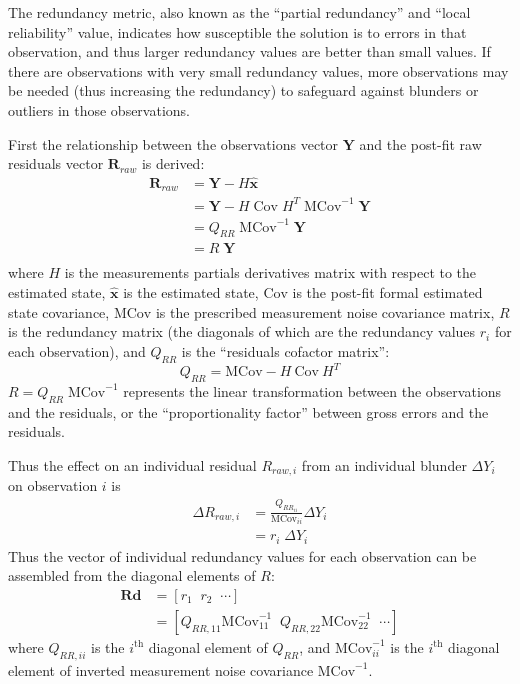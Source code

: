 The redundancy metric, also known as the ``partial redundancy'' and ``local reliability'' value, indicates how susceptible the solution is to errors in that observation, and thus larger redundancy values are better than small values. If there are observations with very small redundancy values, more observations may be needed (thus increasing the redundancy) to safeguard against blunders or outliers in those observations.

First the relationship between the observations vector $\textbf{Y}$ and the post-fit raw residuals vector $\textbf{R}_{raw}$ is derived:
\begin{equation}\label{eq:vhat}
\begin{split}
\textbf{R}_{raw} &= \textbf{Y} - H \hat{\textbf{x}} \\
&= \textbf{Y} - H \; \text{Cov} \; H^T \; \text{MCov}^{-1} \; \textbf{Y} \\
&= Q_{RR} \; \text{MCov}^{-1} \; \textbf{Y} \\
&= R \; \textbf{Y} \\
\end{split}
\end{equation}
where $H$ is the measurements partials derivatives matrix with respect to the estimated state, $\hat{\textbf{x}}$ is the estimated state, $\text{Cov}$ is the post-fit formal estimated state covariance, $\text{MCov}$ is the prescribed measurement noise covariance matrix, $R$ is the redundancy matrix (the diagonals of which are the redundancy values $r_i$ for each observation), and $Q_{RR}$ is the ``residuals cofactor matrix'':
\begin{equation}\label{eq:Qrr} %
Q_{RR} = \text{MCov} - H \: \text{Cov} \: H^T
\end{equation}
$R = Q_{RR} \; \text{MCov}^{-1}$ represents the linear transformation between the observations and the residuals, or the ``proportionality factor'' between gross errors and the residuals. 

Thus the effect on an individual residual $R_{raw,i}$ from an individual blunder $\Delta Y_i$ on observation $i$ is
\begin{equation}\label{eq:BlunderImpactOnRes}
	\begin{split}
		\Delta R_{raw,i} &= \frac{Q_{RR_{ii}}}{\text{MCov}_{ii}} \Delta Y_i \\
		&= r_i \; \Delta Y_i
	\end{split}	
\end{equation}
Thus the vector of individual redundancy values for each observation can be assembled from the diagonal elements of $R$:
\begin{equation}\label{eq:Redundancy}
\begin{split}
\textbf{Rd} &= \left[ r_1 \;\; r_2 \;\; \cdots \right] \\
&= \left[Q_{RR,11} \text{MCov}^{-1}_{11} \;\; Q_{RR,22} \text{MCov}^{-1}_{22} \;\; \cdots \right]
\end{split}
\end{equation}
where $Q_{RR,ii}$ is the $i^{\text{th}}$ diagonal element of $Q_{RR}$, and $\text{MCov}^{-1}_{ii}$ is the $i^{\text{th}}$ diagonal element of inverted measurement noise covariance $\text{MCov}^{-1}$.

